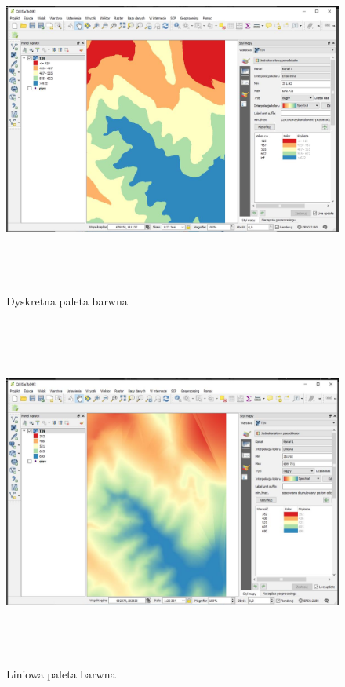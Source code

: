 \documentclass[12pt,a4paper]{book}
\begin{document}
\begin{center}
\begin{figure}
\includegraphics[width=17cm,height=11.529cm]{007-raster-dyskretna.png}
\caption{Dyskretna paleta barwna}
\end{figure}
\end{center}
\begin{center}
\begin{figure}
\includegraphics[width=17cm,height=11.546cm]{007-raster-liniowa.jpg}
\caption{Liniowa paleta barwna}
\end{figure}
\end{center}
\end{document}
